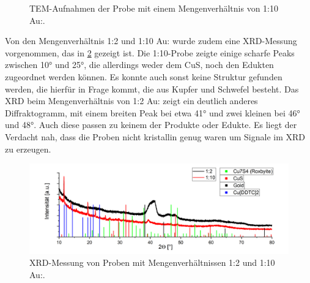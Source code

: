 	\begin{figure}[htbp]
		\centering
		\caption{TEM-Aufnahmen der Probe mit einem Mengenverhältnis von 1:10 Au:.}
		\label{fig:TEM-CuAu-10-1}
	\end{figure}
	
	Von den Mengenverhältnis 1:2 und 1:10 Au: wurde zudem eine XRD-Messung vorgenommen, das in \cref{fig:XRD} gezeigt ist.
	Die 1:10-Probe zeigte einige scharfe Peaks zwischen 10° und 25°, die allerdings weder dem CuS, noch den Edukten zugeordnet werden können.
	Es konnte auch sonst keine Struktur gefunden werden, die hierfür in Frage kommt, die aus Kupfer und Schwefel besteht.
	Das XRD beim  Mengenverhältnis von 1:2 Au: zeigt ein deutlich anderes Diffraktogramm, mit einem breiten Peak bei etwa 41° und zwei kleinen bei 46° und 48°. Auch diese passen zu keinem der Produkte oder Edukte.
	Es liegt der Verdacht nah, dass die Proben nicht kristallin genug waren um Signale im XRD zu erzeugen.
	
	\begin{figure}[H]
		\centering
		\includegraphics[width=\textwidth]{Bilder/XRD-CuS} 	
		\caption{XRD-Messung von Proben mit Mengenverhältnissen 1:2 und 1:10 Au:.}
		\label{fig:XRD}
	\end{figure}
	
